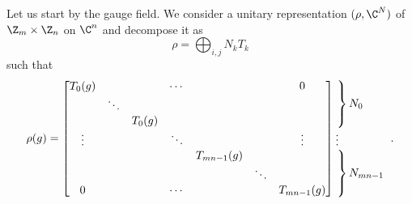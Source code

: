 \documentclass{worksheetclass}
\begin{document}
        Let us start by the gauge field. We consider a unitary representation $(\rho,\C^N)$ of $\Z_m\times \Z_n$ on $\C^n$ and decompose it as
        \begin{equation}
            \rho=\bigoplus_{i,j}N_k T_k
        \end{equation}
        such that
        \begin{equation}
            \rho(g)=
            \begin{bmatrix}
                T_0(g) & & & \cdots & & & 0 \\
                & \ddots & & & & & \\
                & & T_0(g) & & & &  \\
                \vdots & & & \ddots & & & \vdots \\
                & & & & T_{mn-1}(g) & & \\
                & & & & & \ddots & \\
                0 & & & \cdots & & & T_{mn-1}(g) 
            \end{bmatrix}
            \hspace{-0.2cm}
            \begin{tabular}{l}
            $\left.\lefteqn{\phantom{
                \begin{matrix}
                    a_0\\ \ddots\\ a_0\ 
                \end{matrix} 
            }}\right\}N_0$\\
            \vdots \\
            $\left.\lefteqn{\phantom{
                \begin{matrix}
                    b_0\\ \ddots\\ b_0\ 
                \end{matrix}
            }} \right\}N_{mn-1}$
            \end{tabular}.
        \end{equation}
\end{document}
